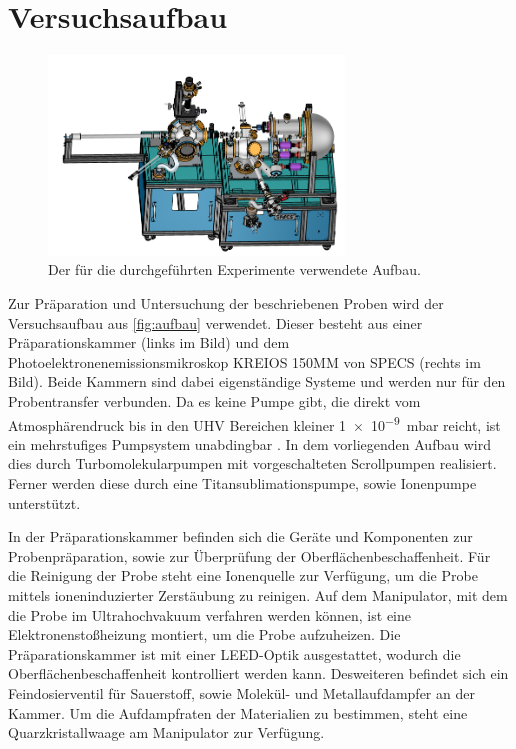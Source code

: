     \section{Versuchsaufbau} \label{sec:Versuchsaufbau}
        \begin{figure}
            \centering
            \includegraphics[width=0.7\textwidth]{MM.png}
            \caption{Der für die durchgeführten Experimente verwendete Aufbau.}
            \label{fig:aufbau}
        \end{figure}
        Zur Präparation und Untersuchung der beschriebenen Proben wird der Versuchsaufbau aus \autoref{fig:aufbau} verwendet.
        Dieser besteht aus einer Präparationskammer (links im Bild) und dem Photoelektronenemissionsmikroskop KREIOS 150MM von SPECS (rechts im Bild).
        Beide Kammern sind dabei eigenständige Systeme und werden nur für den Probentransfer verbunden.
        Da es keine Pumpe gibt, die direkt vom Atmosphärendruck bis in den UHV Bereichen kleiner \SI{1e-9}{\milli\bar} reicht, ist ein mehrstufiges Pumpsystem unabdingbar \cite{Henzler}.
        In dem vorliegenden Aufbau wird dies durch Turbomolekularpumpen mit vorgeschalteten Scrollpumpen realisiert.
        Ferner werden diese durch eine Titansublimationspumpe, sowie Ionenpumpe unterstützt.

        In der Präparationskammer befinden sich die Geräte und Komponenten zur Probenpräparation, sowie zur Überprüfung der Oberflächenbeschaffenheit.
        Für die Reinigung der Probe steht eine Ionenquelle zur Verfügung, um die Probe mittels ioneninduzierter Zerstäubung zu reinigen.
        Auf dem Manipulator, mit dem die Probe im Ultrahochvakuum verfahren werden können, ist eine Elektronenstoßheizung montiert, um die Probe aufzuheizen.
        Die Präparationskammer ist mit einer LEED-Optik ausgestattet, wodurch die Oberflächenbeschaffenheit kontrolliert werden kann.
        Desweiteren befindet sich ein Feindosierventil für Sauerstoff, sowie Molekül- und Metallaufdampfer an der Kammer.
        Um die Aufdampfraten der Materialien zu bestimmen, steht eine Quarzkristallwaage am Manipulator zur Verfügung.

